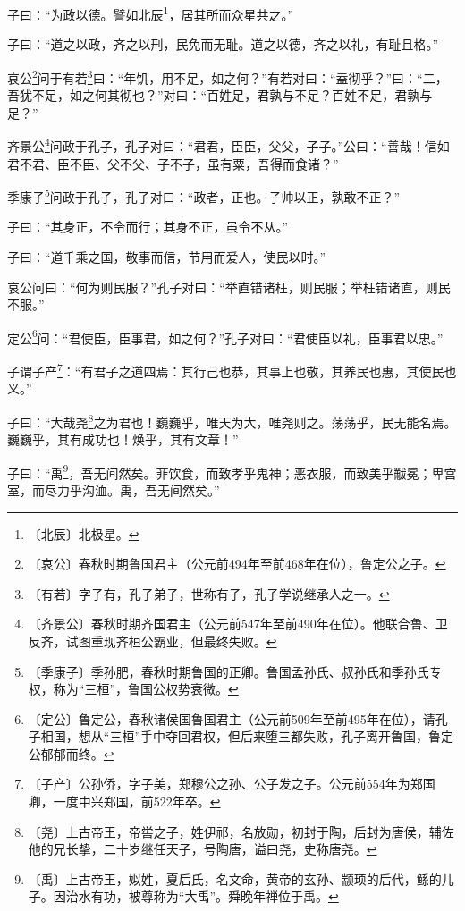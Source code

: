 \documentclass[12pt,UTF-8,openany]{ctexbook}
\begin{document}
\begin{normalsize}
    
    子曰：“为政以德。譬如北辰\footnote{〔北辰〕北极星。}，居其所而众星共之。”
    
    子曰：“道之以政，齐之以刑，民免而无耻。道之以德，齐之以礼，有耻且格。”
    
    哀公\footnote{〔哀公〕春秋时期鲁国君主（公元前494年至前468年在位），鲁定公之子。}问于有若\footnote{〔有若〕字子有，孔子弟子，世称有子，孔子学说继承人之一。}曰：“年饥，用不足，如之何？”有若对曰：“盍彻乎？”曰：“二，吾犹不足，如之何其彻也？”对曰：“百姓足，君孰与不足？百姓不足，君孰与足？”
    
    齐景公\footnote{〔齐景公〕春秋时期齐国君主（公元前547年至前490年在位）。他联合鲁、卫反齐，试图重现齐桓公霸业，但最终失败。}问政于孔子，孔子对曰：“君君，臣臣，父父，子子。”公曰：“善哉！信如君不君、臣不臣、父不父、子不子，虽有粟，吾得而食诸？”
    
    季康子\footnote{〔季康子〕季孙肥，春秋时期鲁国的正卿。鲁国孟孙氏、叔孙氏和季孙氏专权，称为“三桓”，鲁国公权势衰微。}问政于孔子，孔子对曰：“政者，正也。子帅以正，孰敢不正？”
    
    子曰：“其身正，不令而行；其身不正，虽令不从。”
    
    子曰：“道千乘之国，敬事而信，节用而爱人，使民以时。”
    
    哀公问曰：“何为则民服？”孔子对曰：“举直错诸枉，则民服；举枉错诸直，则民不服。”
    
    定公\footnote{〔定公〕鲁定公，春秋诸侯国鲁国君主（公元前509年至前495年在位），请孔子相国，想从“三桓”手中夺回君权，但后来堕三都失败，孔子离开鲁国，鲁定公郁郁而终。}问：“君使臣，臣事君，如之何？”孔子对曰：“君使臣以礼，臣事君以忠。”
    
    子谓子产\footnote{〔子产〕公孙侨，字子美，郑穆公之孙、公子发之子。公元前554年为郑国卿，一度中兴郑国，前522年卒。}：“有君子之道四焉：其行己也恭，其事上也敬，其养民也惠，其使民也义。”
    
    子曰：“大哉尧\footnote{〔尧〕上古帝王，帝喾之子，姓伊祁，名放勋，初封于陶，后封为唐侯，辅佐他的兄长挚，二十岁继任天子，号陶唐，谥曰尧，史称唐尧。}之为君也！巍巍乎，唯天为大，唯尧则之。荡荡乎，民无能名焉。巍巍乎，其有成功也！焕乎，其有文章！”
    
    子曰：“禹\footnote{〔禹〕上古帝王，姒姓，夏后氏，名文命，黄帝的玄孙、颛顼的后代，鲧的儿子。因治水有功，被尊称为“大禹”。舜晚年禅位于禹。}，吾无间然矣。菲饮食，而致孝乎鬼神；恶衣服，而致美乎黻冕；卑宫室，而尽力乎沟洫。禹，吾无间然矣。”
\end{normalsize}
\end{document}
